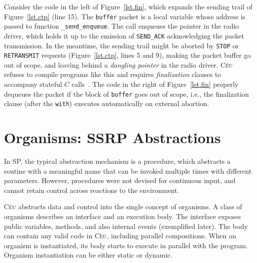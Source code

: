 \documentclass{acm_proc_article-sp}
\newcommand{\CEU}{\textsc{C\'{e}u}\xspace}
\newcommand{\code}[1] {{\small{\texttt{#1}}}}
\newcommand{\1}{\;}
\newcommand{\2}{\;\;}
\newcommand{\3}{\;\;\;}
\newcommand{\5}{\;\;\;\;\;}
\begin{document}
Consider the code in the left of Figure~\ref{lst.fin}, which expands the 
sending trail of Figure~\ref{lst.ctp} (line 15).
%
The \code{buffer} packet is a local variable whose address is passed to 
function \code{\_send\_enqueue}.
The call enqueues the pointer in the radio driver, which holds it up to the 
emission of \code{SEND\_ACK} acknowledging the packet transmission.
%
In the meantime, the sending trail might be aborted by \code{STOP} or 
\code{RETRANSMIT} requests (Figure~\ref{lst.ctp}, lines 5 and 9), making the 
packet buffer go out of scope, and leaving behind a \emph{dangling pointer} in 
the radio driver.
%
\CEU refuses to compile programs like this and requires \emph{finalization} 
clauses to accompany stateful $C$ calls~\cite{ceu.sensys13}.
The code in the right of Figure~\ref{lst.fin} properly dequeues the packet if
the block of \code{buffer} goes out of scope, i.e., the finalization clause 
(after the \code{with}) executes automatically on external abortion.

\newpage
\section{Organisms: SSRP Abstractions}
\label{sec.orgs}


%
In SP, the typical abstraction mechanism is a procedure, which abstracts a 
routine with a meaningful name that can be invoked multiple times with 
different parameters.
%
However, procedures were not devised for continuous input, and cannot retain 
control across reactions to the environment.
%

\CEU abstracts data and control into the single concept of organisms.
%
A class of organisms describes an interface and an execution body.
The interface exposes public variables, methods, and also internal events 
(exemplified later).
The body can contain any valid code in \CEU, including parallel compositions.
When an organism is instantiated, its body starts to execute in parallel with 
the program.
Organism instantiation can be either static or dynamic.
\end{document}
